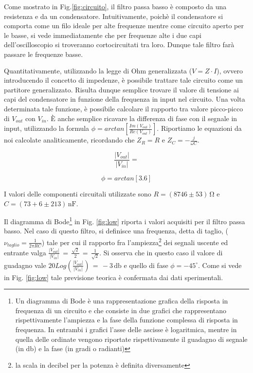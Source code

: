 Come mostrato in Fig.\ref{fig:circuito}, il filtro passa basso è composto da una resistenza e da un condensatore. Intuitivamente, poichè il condensatore si comporta come un filo ideale per alte frequenze mentre come circuito aperto per le basse, si vede immediatamente che per frequenze alte i due capi dell'oscilloscopio si troveranno cortocircuitati tra loro. Dunque tale filtro farà passare le frequenze basse.

Quantitativamente, utilizzando la legge di Ohm generalizzata ($V=Z \cdot I$), ovvero introducendo il concetto di impedenze, è possibile trattare tale circuito come un partitore generalizzato. Risulta dunque semplice trovare il valore di tensione ai capi del condensatore in funzione della frequenza in input nel circuito. Una volta determinata tale funzione, è possibile calcolare il rapporto tra valore picco-picco di $V_{out}$ con $V_{in}$. \`E anche semplice ricavare la differenza di fase con il segnale in input, utilizzando la formula $\phi=arctan[\frac{Im(V_{out})}{Re(V_{out})}]$. Riportiamo le equazioni da noi calcolate analiticamente, ricordando che $Z_R=R$ e $Z_C=-\frac{j}{\omega C}$.\\

\noindent
\begin{minipage}{.5\linewidth}
\begin{equation}
\frac{|V_{out}|}{|V_{in}|}=
\label{eq:lowGain}
\end{equation}

\end{minipage}%
\begin{minipage}{.5\linewidth}
\begin{equation}
\phi=arctan[3.6]
\label{eq:lowPhi}
\end{equation}
\end{minipage}
\break

I valori delle componenti circuitali utilizzate sono $R=(8746 \pm 53)\,\si{\ohm}$ e $C=(73+6 \pm 213)\,\si{\nano\farad}$.

Il diagramma di Bode\footnote{Un diagramma di Bode è una rappresentazione grafica della risposta in frequenza di un circuito e che consiste in due grafici che rappresentano rispettivamente l'ampiezza e la fase della funzione complessa di risposta in frequenza. In entrambi i grafici l'asse delle ascisse è logaritmica, mentre in quella delle ordinate vengono riportate rispettivamente il guadagno di segnale (in $\si{\decibel}$) e la fase (in gradi o radianti)} in Fig. \ref{fig:low} riporta i valori acquisiti per il filtro passa basso. Nel caso di questo filtro, si definisce una frequenza, detta di taglio, ($\nu_{taglio}=\frac{1}{2 \pi RC}$) tale per cui il rapporto fra l'ampiezza\footnote{la scala in decibel per la potenza è definita diversamente} dei segnali uscente ed entrante valga $\frac{|V_{out}|}{|V_{in}|}\,=\,\frac{\sqrt{2}}{2}\,=\,\frac{1}{\sqrt{2}}$. Si osserva che in questo caso il valore di guadagno vale $20Log(\frac{|V_{out}|}{|V_{in}|})\,=\,-3\,\si{\decibel}$ e quello di fase $\phi=-45 ^{\circ}$. Come si vede in Fig. \ref{fig:low} tale previsione teorica è confermata dai dati sperimentali.

